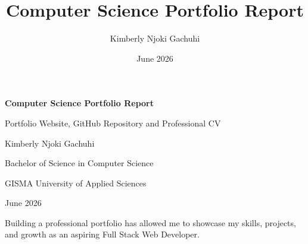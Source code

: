 \documentclass[12pt,a4paper]{article}
\title{Computer Science Portfolio Report}
\author{Kimberly Njoki Gachuhi}
\date{June 2026}
\begin{document}
\begin{titlepage}
\thispagestyle{empty}

\begin{center}

\vspace*{2cm}

{\Huge\bfseries
Computer Science Portfolio Report
}

\vspace{0.3cm}

{\Large\color{KimPink}
Portfolio Website, GitHub Repository and Professional CV
}

\vspace{0.3cm}

\vspace{0.2cm}

\begin{tcolorbox}[
colback=KimPink,
colframe=KimPink,
height=0.8cm,
arc=0mm,
boxrule=0pt]
\end{tcolorbox}
\vspace{1.5cm}

{\Large Kimberly Njoki Gachuhi}

\vspace{0.5cm}

Bachelor of Science in Computer Science

\vspace{0.3cm}

GISMA University of Applied Sciences

\vspace{0.3cm}

June 2026
\vspace{1cm}

\begin{tcolorbox}[
colback=KimPink!5,
colframe=KimPink,
width=0.75\textwidth]

Building a professional portfolio has allowed me to showcase my skills, projects, and growth as an aspiring Full Stack Web Developer.

\end{tcolorbox}

\vfill


\vspace{1cm}



\end{center}

\end{titlepage}

\clearpage
\end{document}
